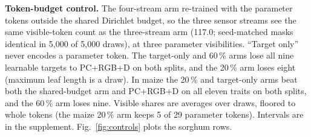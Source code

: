 \begin{table}[t]
  \caption{\textbf{Token-budget control.} The four-stream arm
  re-trained with the parameter tokens outside the shared Dirichlet budget, so
  the three sensor streams see the same visible-token count as the three-stream
  arm (117.0; seed-matched masks identical in 5{,}000 of 5{,}000 draws), at
  three parameter visibilities. ``Target only'' never encodes a parameter
  token. The target-only and 60\,\% arms lose all nine learnable targets to
  PC+RGB+D on both splits, and the 20\,\% arm loses eight (maximum leaf length
  is a draw). In maize the 20\,\% and target-only arms beat both the shared-budget
  arm and PC+RGB+D on all eleven traits on both splits, and the 60\,\% arm loses
  nine. Visible shares are averages over draws, floored to whole tokens (the
  maize 20\,\% arm keeps 5 of 29 parameter tokens). Intervals are in the supplement. Fig.~\ref{fig:controls} plots the sorghum rows.}
  \label{tab:control}
\end{table}

